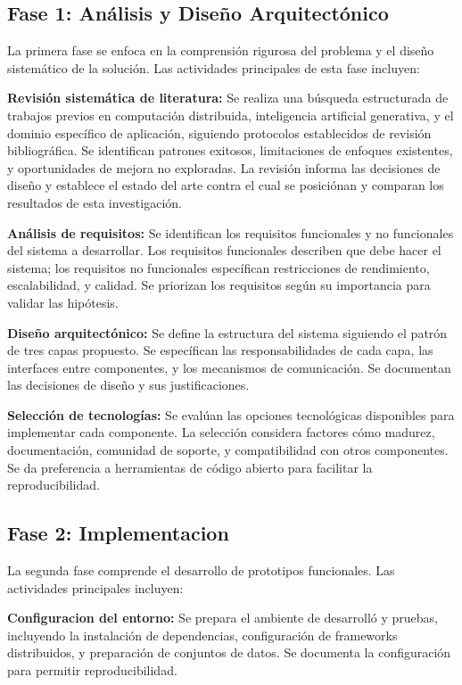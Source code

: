 \documentclass[12pt,a4paper,twoside]{book}
\begin{document}
\subsection{Fase 1: Análisis y Diseño Arquitectónico}

La primera fase se enfoca en la comprensión rigurosa del problema y el diseño sistemático de la solución. Las actividades principales de esta fase incluyen:

\textbf{Revisión sistemática de literatura:} Se realiza una búsqueda estructurada de trabajos previos en computación distribuida, inteligencia artificial generativa, y el dominio específico de aplicación, siguiendo protocolos establecidos de revisión bibliográfica. Se identifican patrones exitosos, limitaciones de enfoques existentes, y oportunidades de mejora no exploradas. La revisión informa las decisiones de diseño y establece el estado del arte contra el cual se posiciónan y comparan los resultados de esta investigación.

\textbf{Análisis de requisitos:} Se identifican los requisitos funcionales y no funcionales del sistema a desarrollar. Los requisitos funcionales describen que debe hacer el sistema; los requisitos no funcionales específican restricciones de rendimiento, escalabilidad, y calidad. Se priorizan los requisitos según su importancia para validar las hipótesis.

\textbf{Diseño arquitectónico:} Se define la estructura del sistema siguiendo el patrón de tres capas propuesto. Se específican las responsabilidades de cada capa, las interfaces entre componentes, y los mecanismos de comunicación. Se documentan las decisiones de diseño y sus justificaciones.

\textbf{Selección de tecnologías:} Se evalúan las opciones tecnológicas disponibles para implementar cada componente. La selección considera factores cómo madurez, documentación, comunidad de soporte, y compatibilidad con otros componentes. Se da preferencia a herramientas de código abierto para facilitar la reproducibilidad.

\subsection{Fase 2: Implementacion}

La segunda fase comprende el desarrollo de prototipos funcionales. Las actividades principales incluyen:

\textbf{Configuracion del entorno:} Se prepara el ambiente de desarrolló y pruebas, incluyendo la instalación de dependencias, configuración de frameworks distribuidos, y preparación de conjuntos de datos. Se documenta la configuración para permitir reproducibilidad.
\end{document}
